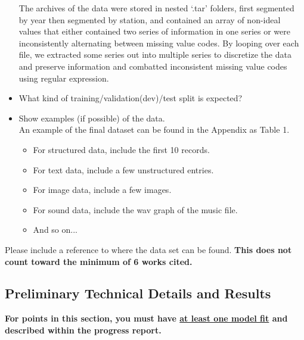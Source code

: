 \documentclass[conference]{IEEEtran}
\begin{document}
\begin{itemize}
  The archives of the data were stored in nested `.tar' folders, first segmented by year then segmented by station, and contained an array of non-ideal values that either contained two series of information in one series or were inconsistently alternating between missing value codes. By looping over each file, we extracted some series out into multiple series to discretize the data and preserve information and combatted inconsistent missing value codes using regular expression. \\

  \item What kind of training/validation(dev)/test split is expected? \\

  \item Show examples (if possible) of the data. \\

  An example of the final dataset can be found in the Appendix as Table 1. \\

  \begin{itemize}
    \item For structured data, include the first 10 records.
    \item For text data, include a few unstructured entries.
    \item For image data, include a few images.
    \item For sound data, include the wav graph of the music file.
    \item And so on...
  \end{itemize}
\end{itemize}

Please include a reference to where the data set can be found. \textbf{This does not count toward the minimum of 6 works cited.}

\subsection{Preliminary Technical Details and Results}

\textbf{For points in this section, you must have \underline{at least one model fit} and described within the progress report.}
\end{document}
